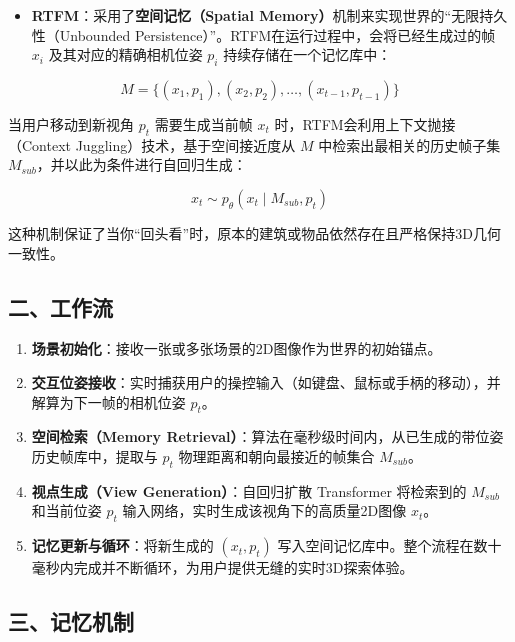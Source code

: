 \begin{itemize}
\tightlist
\item
  \textbf{RTFM}：采用了\textbf{空间记忆（Spatial Memory）}机制来实现世界的``无限持久性（Unbounded Persistence）''。RTFM在运行过程中，会将已经生成过的帧 \(x_i\) 及其对应的精确相机位姿 \(p_i\) 持续存储在一个记忆库中：
\end{itemize}

\[
M = \{(x_1,p_1),(x_2,p_2),\ldots,(x_{t-1},p_{t-1})\}
\]

当用户移动到新视角 \(p_t\) 需要生成当前帧 \(x_t\) 时，RTFM会利用上下文抛接（Context Juggling）技术，基于空间接近度从 \(M\) 中检索出最相关的历史帧子集 \(M_{sub}\)，并以此为条件进行自回归生成：

\[
x_t \sim p_\theta(x_t \mid M_{sub},p_t)
\]

这种机制保证了当你``回头看''时，原本的建筑或物品依然存在且严格保持3D几何一致性。

\hypertarget{ux4e8cux5de5ux4f5cux6d41-8}{%
\subsection{二、工作流}\label{ux4e8cux5de5ux4f5cux6d41-8}}

\begin{enumerate}
\def\labelenumi{\arabic{enumi}.}
\tightlist
\item
  \textbf{场景初始化}：接收一张或多张场景的2D图像作为世界的初始锚点。
\item
  \textbf{交互位姿接收}：实时捕获用户的操控输入（如键盘、鼠标或手柄的移动），并解算为下一帧的相机位姿 \(p_t\)。
\item
  \textbf{空间检索（Memory Retrieval）}：算法在毫秒级时间内，从已生成的带位姿历史帧库中，提取与 \(p_t\) 物理距离和朝向最接近的帧集合 \(M_{sub}\)。
\item
  \textbf{视点生成（View Generation）}：自回归扩散 Transformer 将检索到的 \(M_{sub}\) 和当前位姿 \(p_t\) 输入网络，实时生成该视角下的高质量2D图像 \(x_t\)。
\item
  \textbf{记忆更新与循环}：将新生成的 \((x_t,p_t)\) 写入空间记忆库中。整个流程在数十毫秒内完成并不断循环，为用户提供无缝的实时3D探索体验。
\end{enumerate}

\hypertarget{ux4e09ux8bb0ux5fc6ux673aux5236}{%
\subsection{三、记忆机制}\label{ux4e09ux8bb0ux5fc6ux673aux5236}}

